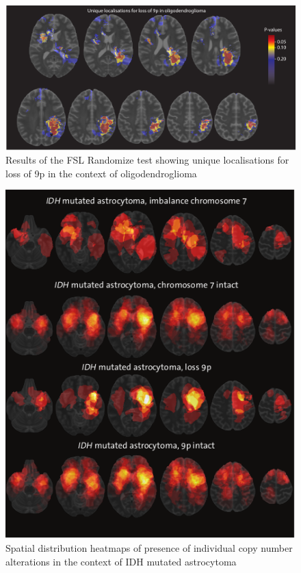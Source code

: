 \begin{figure}[htbp]
    \centering
    \includegraphics[width=\textwidth]{Figures/p_value_9p.png}
    \caption{Results of the FSL Randomize test showing unique localisations for loss of 9p in the context of oligodendroglioma}\label{fig:LGG_location_p_value_9p}
\end{figure}

\begin{figure}[htbp]
    \centering
    \includegraphics[width=\textwidth]{Figures/heatmap_chromosome_7_9.png}
    \caption{Spatial distribution heatmaps of presence of individual copy number alterations in the context of IDH mutated astrocytoma}\label{fig:LGG_location_heatmap_chromosome_7_9}
\end{figure}

